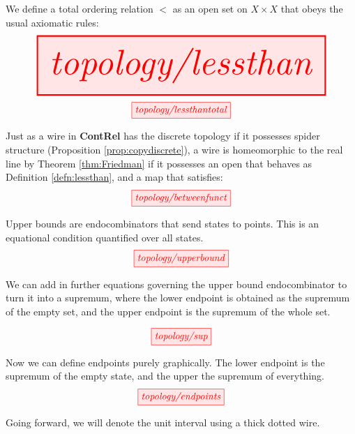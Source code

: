 \begin{myboxR}
\begin{defn}\label{defn:lessthan}
We define a total ordering relation $<$ as an open set on $X \times X$ that obeys the usual axiomatic rules:
\[\resizebox{\textwidth}{!}{\tikzfig{topology/lessthan}}\]
\[\tikzfig{topology/lessthantotal}\]
\end{defn}
\end{myboxR}

\begin{myboxB}
\begin{defn}\label{defn:friedfunct}
Just as a wire in \textbf{ContRel} has the discrete topology if it possesses spider structure (Proposition \ref{prop:copydiscrete}), a wire is homeomorphic to the real line by Theorem \ref{thm:Friedman} if it possesses an open that behaves as Definition \ref{defn:lessthan}, and a map that satisfies:
\[\tikzfig{topology/betweenfunct}\]
\end{defn}
\end{myboxB}

\begin{myboxR}
\begin{defn}\label{defn:bounds}
Upper bounds are endocombinators that send states to points. This is an equational condition quantified over all states.
\[\tikzfig{topology/upperbound}\]
\end{defn}
We can add in further equations governing the upper bound endocombinator to turn it into a supremum, where the lower endpoint is obtained as the supremum of the empty set, and the upper endpoint is the supremum of the whole set.
\begin{defn}[Suprema]\label{defn:sup}
\[\tikzfig{topology/sup}\]
\end{defn}
\begin{defn}[Endpoints]\label{defn:endpoints}
Now we can define endpoints purely graphically. The lower endpoint is the supremum of the empty state, and the upper the supremum of everything.
\[\tikzfig{topology/endpoints}\]
\end{defn}
Going forward, we will denote the unit interval using a thick dotted wire.

\end{myboxR}

